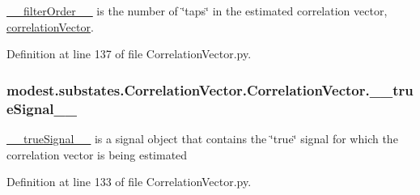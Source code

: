 \hyperlink{classmodest_1_1substates_1_1CorrelationVector_1_1CorrelationVector_a939a2ca80dec51270e5df231d98983d5}{\+\_\+\+\_\+filter\+Order\+\_\+\+\_\+} is the number of \char`\"{}taps\char`\"{} in the estimated correlation vector, \hyperlink{classmodest_1_1substates_1_1CorrelationVector_1_1CorrelationVector_a79191f74fabdb5dbea025f2bf3c4c2b2}{correlation\+Vector}. 



Definition at line 137 of file Correlation\+Vector.\+py.

\subsubsection[{\texorpdfstring{\+\_\+\+\_\+true\+Signal\+\_\+\+\_\+}{__trueSignal__}}]{\setlength{\rightskip}{0pt plus 5cm}modest.\+substates.\+Correlation\+Vector.\+Correlation\+Vector.\+\_\+\+\_\+true\+Signal\+\_\+\+\_\+\hspace{0.3cm}{\ttfamily [private]}}\hypertarget{classmodest_1_1substates_1_1CorrelationVector_1_1CorrelationVector_a40f65c10e255c043d8f56d17d152e705}{}\label{classmodest_1_1substates_1_1CorrelationVector_1_1CorrelationVector_a40f65c10e255c043d8f56d17d152e705}


\hyperlink{classmodest_1_1substates_1_1CorrelationVector_1_1CorrelationVector_a40f65c10e255c043d8f56d17d152e705}{\+\_\+\+\_\+true\+Signal\+\_\+\+\_\+} is a signal object that contains the \char`\"{}true\char`\"{} signal for which the correlation vector is being estimated 



Definition at line 133 of file Correlation\+Vector.\+py.

